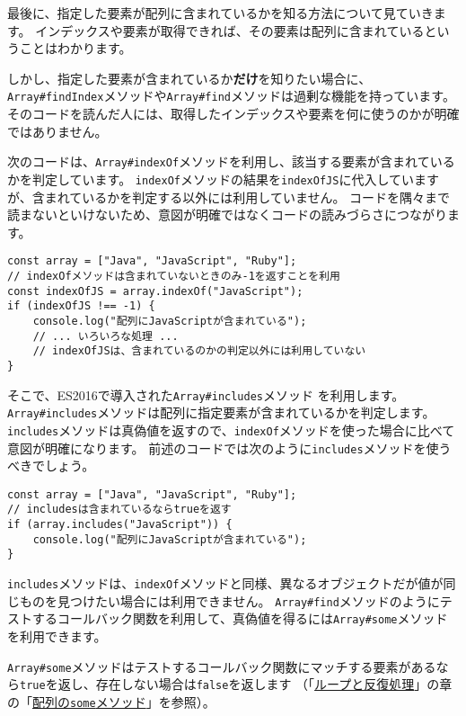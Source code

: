 最後に、指定した要素が配列に含まれているかを知る方法について見ていきます。
インデックスや要素が取得できれば、その要素は配列に含まれているということはわかります。

しかし、指定した要素が含まれているか\textbf{だけ}を知りたい場合に、
\texttt{Array\#findIndex}メソッドや\texttt{Array\#find}メソッドは過剰な機能を持っています。
そのコードを読んだ人には、取得したインデックスや要素を何に使うのかが明確ではありません。

次のコードは、\texttt{Array\#indexOf}メソッドを利用し、該当する要素が含まれているかを判定しています。
\texttt{indexOf}メソッドの結果を\texttt{indexOfJS}に代入していますが、含まれているかを判定する以外には利用していません。
コードを隅々まで読まないといけないため、意図が明確ではなくコードの読みづらさにつながります。

\begin{lstlisting}
const array = ["Java", "JavaScript", "Ruby"];
// indexOfメソッドは含まれていないときのみ-1を返すことを利用
const indexOfJS = array.indexOf("JavaScript");
if (indexOfJS !== -1) {
    console.log("配列にJavaScriptが含まれている");
    // ... いろいろな処理 ...
    // indexOfJSは、含まれているのかの判定以外には利用していない
}
\end{lstlisting}

そこで、ES2016で導入された\texttt{Array\#includes}メソッド\,\protect{}\,を利用します。
\texttt{Array\#includes}メソッドは配列に指定要素が含まれているかを判定します。
\texttt{includes}メソッドは真偽値を返すので、\texttt{indexOf}メソッドを使った場合に比べて意図が明確になります。
前述のコードでは次のように\texttt{includes}メソッドを使うべきでしょう。

\begin{lstlisting}
const array = ["Java", "JavaScript", "Ruby"];
// includesは含まれているならtrueを返す
if (array.includes("JavaScript")) {
    console.log("配列にJavaScriptが含まれている");
}
\end{lstlisting}

\texttt{includes}メソッドは、\texttt{indexOf}メソッドと同様、異なるオブジェクトだが値が同じものを見つけたい場合には利用できません。
\texttt{Array\#find}メソッドのようにテストするコールバック関数を利用して、真偽値を得るには\texttt{Array\#some}メソッドを利用できます。

\texttt{Array\#some}メソッドはテストするコールバック関数にマッチする要素があるなら\texttt{true}を返し、存在しない場合は\texttt{false}を返します
（「\hyperlink{loop-and-iteration}{ループと反復処理}」の章の「\hyperlink{array-some}{配列の\texttt{some}メソッド}」を参照）。

